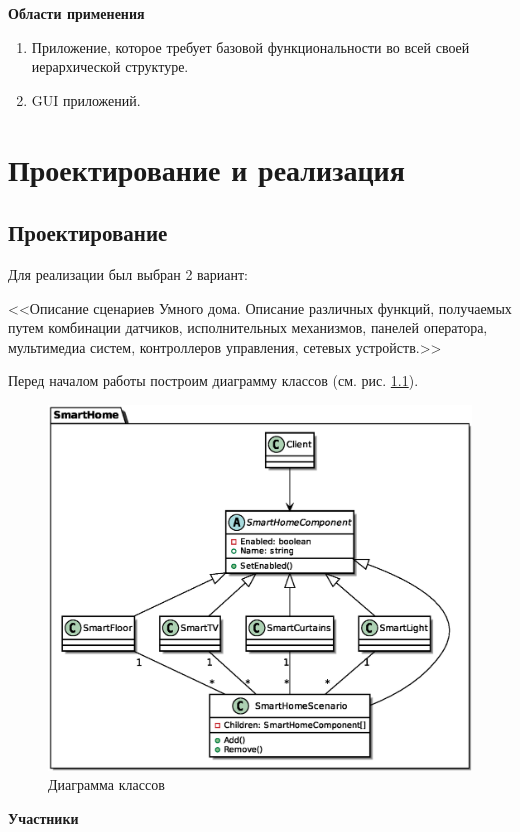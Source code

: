 \documentclass[PI,LAB]{HSEUniversity}
\begin{document}
\textbf{Области применения}

\begin{enumerate}
  \item Приложение, которое требует базовой функциональности во всей своей иерархической структуре.
  \item GUI приложений. 
\end{enumerate}

\chapter{Проектирование и реализация}
\section{Проектирование}
Для реализации был выбран 2 вариант:

<<Описание сценариев Умного дома. Описание различных функций, получаемых путем комбинации датчиков, исполнительных механизмов, панелей оператора, мультимедиа систем, контроллеров управления, сетевых устройств.>>

Перед началом работы построим диаграмму классов (см. рис. \ref{fig:Task_CD}).
 \begin{figure}[p]
   \centering
   \includegraphics[scale=0.75]{Task_CD.eps}
   \caption{Диаграмма классов}
   \label{fig:Task_CD}
 \end{figure}

\textbf{Участники}
\end{document}
